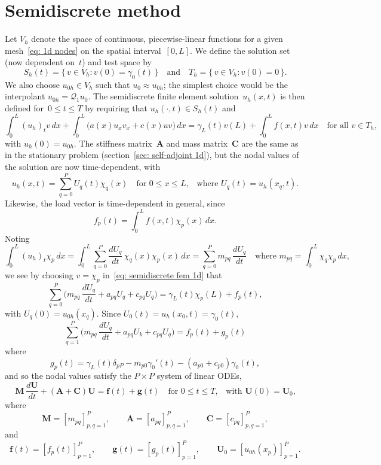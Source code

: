 \section{Semidiscrete method}\label{sec: semidiscrete parabolic FEM}
Let $V_h$ denote the space of continuous, piecewise-linear functions for a 
given mesh~\eqref{eq: 1d nodes} on the spatial interval~$[0,L]$.  We define the 
solution set (now dependent on~$t$) and test space by
\[
S_h(t)=\{\,v\in V_h:v(0)=\gamma_0(t)\,\}
\quad\text{and}\quad
T_h=\{\,v\in V_h:v(0)=0\,\}.
\]
We also choose $u_{0h}\in V_h$ such that $u_0\approx u_{0h}$; the simplest 
choice would be the interpolant $u_{0h}=\mathcal{Q}_1u_0$. The semidiscrete
finite element solution~$u_h(x,t)$ is then defined for~$0\le t\le T$ by 
requiring that $u_h(\cdot,t)\in S_h(t)$ and
\begin{equation}\label{eq: semidiscrete fem 1d}
\int_0^L(u_h)_tv\,dx+\int_0^L\bigl(a(x)u_xv_x+c(x)uv\bigr)\,dx
    =\gamma_L(t)v(L)+\int_0^Lf(x,t)v\,dx
\quad\text{for all $v\in T_h$,}
\end{equation}
with $u_h(0)=u_{0h}$. The stiffness matrix~$\boldsymbol{A}$ and mass 
matrix~$\boldsymbol{C}$ are the same as in the stationary problem 
(section~\ref{sec: self-adjoint 1d}), but the nodal 
values of the solution are now time-dependent, with
\[
u_h(x,t)=\sum_{q=0}^P U_q(t)\chi_q(x)\quad\text{for $0\le x\le L$,}\quad
\text{where $U_q(t)=u_h(x_q,t)$.}
\]
Likewise, the load vector is time-dependent in general, since 
\[
f_p(t)=\int_0^Lf(x,t)\chi_p(x)\,dx.
\]
Noting 
\[
\int_0^L(u_h)_t\chi_p\,dx=\int_0^L\sum_{q=0}^P
    \frac{dU_q}{dt}\,\chi_q(x)\chi_p(x)\,dx=\sum_{q=0}^P m_{pq}\,\frac{dU_q}{dt}
    \quad\text{where $m_{pq}=\int_0^L\chi_q\chi_p\,dx$,}
\]
we see by choosing $v=\chi_p$ in~\eqref{eq: semidiscrete fem 1d} that
\[
\sum_{q=0}^P\biggl(m_{pq}\,\frac{dU_q}{dt}+a_{pq}U_q+c_{pq}U_q\biggr)
    =\gamma_L(t)\chi_p(L)+f_p(t),
\]
with $U_q(0)=u_{0h}(x_q)$.  Since $U_0(t)=u_h(x_0,t)=\gamma_0(t)$,
\[
\sum_{q=1}^P\biggl(m_{pq}\,\frac{dU_q}{dt}+a_{pq}U_k+c_{pq}U_q\biggr)
    =f_p(t)+g_p(t)
\]
where
\[
g_p(t)=\gamma_L(t)\delta_{pP}-m_{p0}\gamma_0'(t)-(a_{p0}+c_{p0})\gamma_0(t),
\]
and so the nodal values satisfy the $P\times P$ system of linear ODEs,
\begin{equation}\label{eq: semidiscrete fem 1d ODE}
\boldsymbol{M}\,\frac{d\boldsymbol{U}}{dt}
+(\boldsymbol{A}+\boldsymbol{C})\boldsymbol{U}=\boldsymbol{f}(t)
    +\boldsymbol{g}(t)\quad\text{for $0\le t\le T$,}
    \quad\text{with $\boldsymbol{U}(0)=\boldsymbol{U}_0$,}
\end{equation}
where 
\[
\boldsymbol{M}=[m_{pq}]_{p,q=1}^P,\qquad 
\boldsymbol{A}=[a_{pq}]_{p,q=1}^P,\qquad
\boldsymbol{C}=[c_{pq}]_{p,q=1}^P,
\]
and
\[
\boldsymbol{f}(t)=[f_p(t)]_{p=1}^P,\qquad
\boldsymbol{g}(t)=[g_p(t)]_{p=1}^P,\qquad
\boldsymbol{U}_0=[u_{0h}(x_p)]_{p=1}^P.
\]

